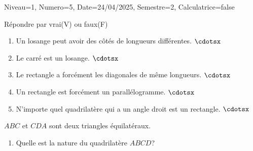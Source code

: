 \documentclass[a4paper,12pt]{article}
\begin{document}
\begin{Maquette}[DS]{Niveau=1, Numero=5, Date=24/04/2025, Semestre=2, Calculatrice=false}
\begin{exercice}[BaremeDetaille]
Répondre par vrai(V) ou faux(F)
\begin{enumerate}
\item{} Un losange peut avoir des côtés de longueurs différentes. $\cdotsx$
\item{} Le carré est un losange. $\cdotsx$
\item{} Le rectangle a forcément les diagonales de même longueurs. $\cdotsx$
\item{} Un rectangle est forcément un parallélogramme. $\cdotsx$
\item{} N'importe quel quadrilatère qui a un angle droit est un rectangle. $\cdotsx$
\end{enumerate}
\end{exercice}

\begin{exercice}[BaremeDetaille]
\begin{minipage}{.68\linewidth}
$ABC$ et $CDA$ sont deux triangles équilatéraux.
\begin{enumerate}
\item{} Quelle est la nature du quadrilatère $ABCD$?
\end{enumerate}
\anserline[5]
\end{minipage}
\begin{minipage}{.32\linewidth}
\end{minipage}

\end{exercice}


\end{Maquette}
\end{document}
